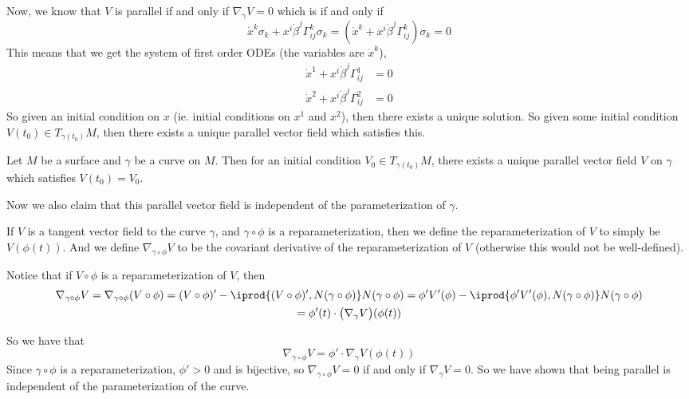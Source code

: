 Now, we know that $V$ is parallel if and only if $\nabla_\gamma V=0$ which is if and only if
\[ \dot x^k\sigma_k+x^i\dot\beta^j\Gamma_{ij}^k\sigma_k = (\dot x^k+x^i\dot\beta^j\Gamma_{ij}^k)\sigma_k = 0 \]
This means that we get the system of first order ODEs (the variables are $\dot x^k$),
\begin{align*}
    \dot x^1+x^i\dot\beta^j\Gamma_{ij}^1 &= 0 \\
    \dot x^2+x^i\dot\beta^j\Gamma_{ij}^2 &= 0
\end{align*}
So given an initial condition on $x$ (ie. initial conditions on $x^1$ and $x^2$), then there exists a unique solution.
So given some initial condition $V(t_0)\in T_{\gamma(t_0)}M$, then there exists a unique parallel vector field which satisfies this.

\begin{prop*}

    Let $M$ be a surface and $\gamma$ be a curve on $M$.
    Then for an initial condition $V_0\in T_{\gamma(t_0)}M$, there exists a unique parallel vector field $V$ on $\gamma$ which satisfies $V(t_0)=V_0$.

\end{prop*}

Now we also claim that this parallel vector field is independent of the parameterization of $\gamma$.

\begin{defn*}

    If $V$ is a tangent vector field to the curve $\gamma$, and $\gamma\circ\phi$ is a reparameterization, then we define the reparameterization of $V$ to simply be $V(\phi(t))$.
    And we define $\nabla_{\gamma\circ\phi}V$ to be the covariant derivative of the reparameterization of $V$ (otherwise this would not be well-defined).

\end{defn*}

Notice that if $V\circ\phi$ is a reparameterization of $V$, then
\begin{multline*}
    \nabla_{\gamma\circ\phi}V = \nabla_{\gamma\circ\phi}(V\circ\phi) = (V\circ\phi)' - \iprod{(V\circ\phi)',N(\gamma\circ\phi)}N(\gamma\circ\phi) =
    \phi'V'(\phi) - \iprod{\phi'V'(\phi),N(\gamma\circ\phi)}N(\gamma\circ\phi) \\
    = \phi'(t)\cdot\bigl(\nabla_\gamma V\bigr)(\phi(t))
\end{multline*}

So we have that
\[ \nabla_{\gamma\circ\phi}V = \phi'\cdot\nabla_\gamma V(\phi(t)) \]
Since $\gamma\circ\phi$ is a reparameterization, $\phi'>0$ and is bijective, so $\nabla_{\gamma\circ\phi}V=0$ if and only if $\nabla_\gamma V=0$.
So we have shown that being parallel is independent of the parameterization of the curve.


